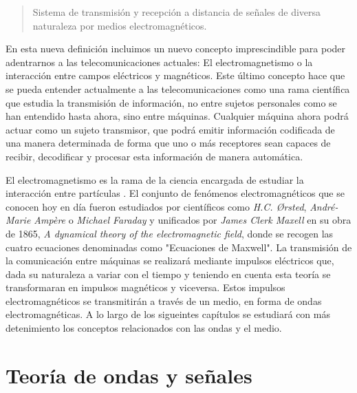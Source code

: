 \begin{quote}

\small Sistema de transmisión y recepción a distancia de señales de diversa naturaleza por medios electromagnéticos.

\end{quote}

\par En esta nueva definición incluimos un nuevo concepto imprescindible para poder adentrarnos a las telecomunicaciones actuales: El electromagnetismo o la interacción entre campos eléctricos y magnéticos. Este último concepto hace que se pueda entender actualmente a las telecomunicaciones como una rama científica que estudia la transmisión de información, no entre sujetos personales como se han entendido hasta ahora, sino entre máquinas. Cualquier máquina  ahora podrá actuar como un sujeto transmisor, que podrá emitir información codificada de una manera determinada de forma que uno o más receptores sean capaces de recibir, decodificar y procesar esta información de manera automática.
\\
\par El electromagnetismo es la rama de la ciencia encargada de estudiar la interacción entre partículas . El conjunto de fenómenos electromagnéticos que se conocen hoy en día fueron estudiados por científicos como \textit{H.C. Ørsted}, \textit{André-Marie Ampère} o \textit{Michael Faraday} y unificados por \textit{James Clerk Maxell} en su obra de 1865, \textit{A dynamical theory of the electromagnetic field}, donde se recogen las cuatro ecuaciones denominadas como "Ecuaciones de Maxwell". La transmisión de la comunicación entre máquinas se realizará mediante impulsos eléctricos que, dada su naturaleza a variar con el tiempo y teniendo en cuenta esta teoría se transformaran en impulsos magnéticos y viceversa. Estos impulsos electromagnéticos se transmitirán a través de un medio, en forma de ondas electromagnéticas. A lo largo de los sigueintes capítulos se estudiará con más detenimiento los conceptos relacionados con las ondas y el medio.

\section{Teoría de ondas y señales}

